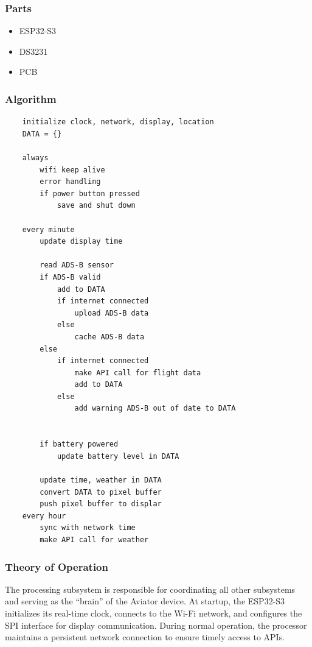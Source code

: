 \subsubsection{Parts}
\begin{itemize}
    \item ESP32-S3
    \item DS3231
    \item PCB
\end{itemize}

\subsubsection{Algorithm}
\begin{lstlisting}
    initialize clock, network, display, location
    DATA = {}

    always 
        wifi keep alive
        error handling
        if power button pressed
            save and shut down
    
    every minute
        update display time

        read ADS-B sensor
        if ADS-B valid
            add to DATA
            if internet connected
                upload ADS-B data
            else
                cache ADS-B data
        else 
            if internet connected
                make API call for flight data
                add to DATA
            else
                add warning ADS-B out of date to DATA
            

        if battery powered
            update battery level in DATA

        update time, weather in DATA
        convert DATA to pixel buffer
        push pixel buffer to displar
    every hour
        sync with network time
        make API call for weather

\end{lstlisting}

\subsubsection{Theory of Operation}
The processing subsystem is responsible for
coordinating all other subsystems and serving
as the “brain” of the Aviator device. At startup,
the ESP32-S3 initializes its real-time clock,
connects to the Wi-Fi network, and
configures the SPI interface for display communication.
During normal operation, the processor maintains a
persistent network connection to ensure timely access
to APIs.

